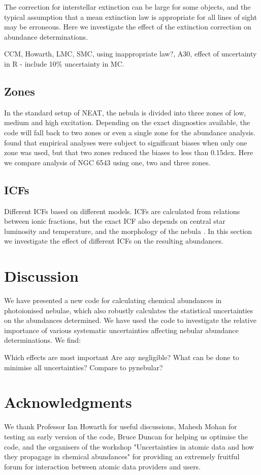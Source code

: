 \documentclass[useAMS,usenatbib]{mn2e}
\begin{document}
The correction for interstellar extinction can be large for some objects, and the typical assumption that a mean extinction law is appropriate for all lines of sight may be erroneous.  Here we investigate the effect of the extinction correction on abundance determinations.

CCM, Howarth, LMC, SMC, using inappropriate law?, A30, effect of uncertainty in R - include 10\% uncertainty in MC.

\subsection{Zones}

In the standard setup of NEAT, the nebula is divided into three zones of low, medium and high excitation.  Depending on the exact diagnostics available, the code will fall back to two zones or even a single zone for the abundance analysis. \citet{2010MNRAS.401.1375E} found that empirical analyses were subject to significant biases when only one zone was used, but that two zones reduced the biases to less than 0.15dex.  Here we compare analysis of NGC 6543 using one, two and three zones.

\subsection{ICFs}

Different ICFs based on different models.  ICFs are calculated from relations between ionic fractions, but the exact ICF also depends on central star luminosity and temperature, and the morphology of the nebula \citep{2011arXiv1110.2709G}.  In this section we investigate the effect of different ICFs on the resulting abundances.

\section{Discussion}

We have presented a new code for calculating chemical abundances in photoionised nebulae, which also robustly calculates the statistical uncertainties on the abundances determined.  We have used the code to investigate the relative importance of various systematic uncertainties affecting nebular abundance determinations.  We find:

Which effects are most important
Are any negligible?
What can be done to minimise all uncertainties?
Compare to pynebular?

\section*{Acknowledgments}

We thank Professor Ian Howarth for useful discussions, Mahesh Mohan for testing an early version of the code, Bruce Duncan for helping us optimise the code, and the organisers of the workshop "Uncertainties in atomic data and how they propagage in chemical abundances" for providing an extremely fruitful forum for interaction between atomic data providers and users.





\label{lastpage}
\end{document}

